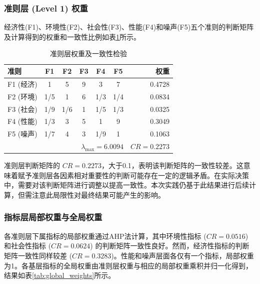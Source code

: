 \documentclass[12pt]{ctexart}
\begin{document}
\subsubsection{准则层 (Level 1) 权重}
经济性(F1)、环境性(F2)、社会性(F3)、性能(F4)和噪声(F5)五个准则的判断矩阵及计算得到的权重和一致性比例如表\ref{tab:level1_weights}所示。
\begin{table}[H]
  \centering
  \caption{准则层权重及一致性检验}
  \label{tab:level1_weights}
  \begin{tabular}{lcccccr}
    \toprule
    准则 & F1 & F2 & F3 & F4 & F5 & 权重 \\
    \midrule
    F1 (经济) & 1 & 5 & 9 & 3 & 7 & 0.4728 \\
    F2 (环境) & 1/5 & 1 & 6 & 1/3 & 1/4 & 0.0834 \\
    F3 (社会) & 1/9 & 1/6 & 1 & 1/5 & 1/3 & 0.0325 \\
    F4 (性能) & 1/3 & 3 & 5 & 1 & 9 & 0.3049 \\
    F5 (噪声) & 1/7 & 4 & 3 & 1/9 & 1 & 0.1063 \\
    \midrule
    \multicolumn{6}{r}{\(\lambda_{\max} = 6.0094\)} & \(CR = 0.2273\) \\
    \bottomrule
  \end{tabular}
\end{table}
准则层判断矩阵的 \(CR = 0.2273\)，大于0.1，表明该判断矩阵的一致性较差。这意味着赋予准则层各因素相对重要性的判断可能存在一定的逻辑矛盾。在实际决策中，需要对该判断矩阵进行调整以提高一致性。本次实践仍基于此结果进行后续计算，但需注意此局限性对最终结果可能产生的影响。

\subsubsection{指标层局部权重与全局权重}
各准则层下属指标的局部权重通过AHP法计算，其中环境性指标 (\(CR=0.0516\)) 和社会性指标 (\(CR=0.0624\)) 的判断矩阵一致性良好。然而，经济性指标的判断矩阵一致性同样较差 (\(CR=0.3283\))。性能和噪声层面各仅有一个指标，局部权重为1。各基层指标的全局权重由准则层权重与相应的局部权重乘积并归一化得到，结果如表\ref{tab:global_weights}所示。
\end{document}
